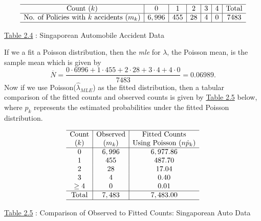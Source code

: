 \documentclass[]{book}
\theoremstyle{definition}
\theoremstyle{definition}
\theoremstyle{definition}
\theoremstyle{remark}
\begin{document}
\[\begin{matrix}
\begin{array}{c|c|c|c|c|c|c}
\hline
\text{Count }(k) & 0 & 1 & 2 & 3 & 4 & \text{Total}\\
\hline
\text{No. of Policies with }k\text{ accidents }(m_k) & 6,996 & 455 & 28 & 4 & 0 & 7483\\
\hline
\end{array}
\end{matrix}\]

\protect\hyperlink{tab:2.4}{Table 2.4} : Singaporean Automobile Accident
Data

If we a fit a Poisson distribution, then the \emph{mle} for \(\lambda\),
the Poisson mean, is the sample mean which is given by \[
\overline{N} = \frac{0\cdot 6996 + 1 \cdot 455 + 2 \cdot 28 + 3 \cdot 4 + 4 \cdot 0}{7483} = 0.06989.
\] Now if we use Poisson(\(\hat{\lambda}_{MLE}\)) as the fitted
distribution, then a tabular comparison of the fitted counts and
observed counts is given by \protect\hyperlink{tab:2.5}{Table 2.5}
below, where \(\hat{p}_k\) represents the estimated probabilities under
the fitted Poisson distribution.

\[\begin{matrix}
\begin{array}{c|c|c}
\hline
\text{Count}  & \text{Observed}  & \text{Fitted Counts}\\
(k) & (m_k) & \text{Using Poisson }(n\hat{p}_k)\\
\hline
0 & 6,996 & 6,977.86 \\
1 & 455 & 487.70 \\
2 & 28 & 17.04 \\
3 & 4 & 0.40 \\
\geq4 & 0 & 0.01\\
\hline
\text{Total} & 7,483 & 7,483.00\\
\hline
\end{array}
\end{matrix}\]

\protect\hyperlink{tab:2.5}{Table 2.5} : Comparison of Observed to
Fitted Counts: Singaporean Auto Data
\end{document}
